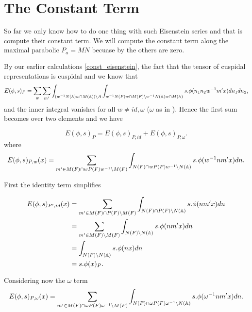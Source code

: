 \section{The Constant Term}
So far we only know how to do one thing with such Eisenstein series and that is compute their constant term. We will compute the constant term along the maximal parabolic \(P_a = MN\) becuase by \cite[II.1.7 (ii)]{moeglinSpectralDecompositionEisenstein1995} the others are zero.

By our earlier calculations \ref{const_eisenstein}, the fact that the tensor of cuspidal representations is cuspidal and \cite{jiangPolesCertainResidual2013} we know that 
     \[E(\phi, s)_{P} = \sum_{ w} \sum_{m'} \int_{(w\inv N(\A)w \cap M(\A)) \setminus A} \int_{w\inv N(F) w \cap M(F) \setminus w\inv N(\A)w \cap M(\A)} s.\phi( n_1 n_2 w\inv m' x)  dn_1 dn_2,\] 
     and the inner integral vanishes for all \(w\neq id, \omega\) (\(\omega\) as in \cite{jiangPolesCertainResidual2013}). Hence the first sum becomes over two elements and we have 

     \[E(\phi, s)_{P} = E(\phi, s)_{P, id} + E(\phi, s)_{P, \omega}.\]
     where 
     \[E(\phi, s)_{P, w}(x) =  \sum_{m'\in M(F)\cap wP(F)w\inv\setminus M(F)} \int_{N(F)\cap wP(F)w\inv \setminus N(\A)} s.\phi( w\inv nm' x)  dn.\]

First the identity term simplifies

     \begin{equation*}
        \begin{aligned}
            E(\phi, s)_{P', id} (x)&=  \sum_{m'\in M(F)\cap P(F)\setminus M(F)} \int_{N(F)\cap P(F) \setminus N(\A)} s.\phi( nm' x)  dn\\
            &= \sum_{m'\in M(F)\setminus M(F)} \int_{N(F)\setminus N(\A)} s.\phi( nm' x)  dn \\
            &=\int_{N(F)\setminus N(\A)} s.\phi( n x)  dn \\
            &= s.\phi(x)_P.
        \end{aligned}
     \end{equation*}

     Considering now the \(\omega\) term 
     \[E(\phi, s)_{P, \omega}(x) =  \sum_{m'\in M(F)\cap \omega P(F)\omega\inv\setminus M(F)} \int_{N(F)\cap \omega P(F)\omega\inv \setminus N(\A)} s.\phi( \omega\inv nm' x)  dn.\]

